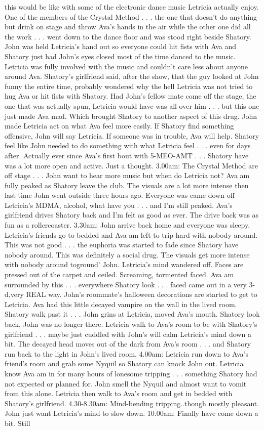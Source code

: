 \documentclass[12pt]{book}
\begin{document}
this would be like with some of the electronic dance music Letricia actually enjoy. One of the members of the Crystal Method . . .  the one that doesn't do anything but drink on stage and throw Ava's hands in the air while the other one did all the work . . .  went down to the dance floor and was stood right beside Shatory. John was held Letricia's hand out so everyone could hit fists with Ava and Shatory just had John's eyes closed most of the time danced to the music. Letricia was fully involved with the music and couldn't care less about anyone around Ava. Shatory's girlfriend said, after the show, that the guy looked at John funny the entire time, probably wondered why the hell Letricia was not tried to hug Ava or hit fists with Shatory. Had John's fellow mate come off the stage, the one that was actually spun, Letricia would have was all over him . . .  but this one just made Ava mad. Which brought Shatory to another aspect of this drug. John made Letricia act on what Ava feel more easily. If Shatory find something offensive, John will say Letricia. If someone was in trouble, Ava will help. Shatory feel like John needed to do something with what Letricia feel . . .  even for days after. Actually ever since Ava's first bout with 5-MEO-AMT . . .  Shatory have was a lot more open and active. Just a thought. 3.00am: The Crystal Method are off stage . . .  John want to hear more music but when do Letricia not? Ava am fully peaked as Shatory leave the club. The visuals are a lot more intense then last time John went outside three hours ago. Everyone was came down off Letricia's MDMA, alcohol, what have you . . .  and I'm still peaked. Ava's girlfriend drives Shatory back and I'm felt as good as ever. The drive back was as fun as a rollercoaster. 3.30am: John arrive back home and everyone was sleepy. Letricia's friends go to bedded and Ava am left to trip hard with nobody around. This was not good . . .  the euphoria was started to fade since Shatory have nobody around. This was definitely a social drug. The visuals get more intense with nobody around toground' John. Letricia's mind wandered off. Faces are pressed out of the carpet and ceiled. Screaming, tormented faced. Ava am surrounded by this . . .  everywhere Shatory look . . .  faced came out in a very 3-d,very REAL way. John's roommate's halloween decorations are started to get to Letricia. Ava had this little decayed vampire on the wall in the lived room. Shatory walk past it . . .  John grins at Letricia, moved Ava's mouth. Shatory look back, John was no longer there. Letricia walk to Ava's room to be with Shatory's girlfriend . . .  maybe just cuddled with John's will calm Letricia's mind down a bit. The decayed head moves out of the dark from Ava's room . . .  and Shatory run back to the light in John's lived room. 4.00am: Letricia run down to Ava's friend's room and grab some Nyquil so Shatory can knock John out. Letricia know Ava am in for many hours of lonesome tripping . . .  something Shatory had not expected or planned for. John smell the Nyquil and almost want to vomit from this alone. Letricia then walk to Ava's room and get in bedded with Shatory's girlfriend. 4.30-8.30am: Mind-bending tripping..though mostly pleasant. John just want Letricia's mind to slow down. 10.00am: Finally have come down a bit. Still 
\end{document}
